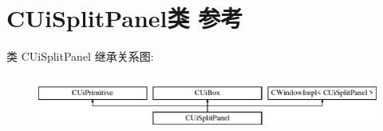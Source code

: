 \hypertarget{class_c_ui_split_panel}{}\section{C\+Ui\+Split\+Panel类 参考}
\label{class_c_ui_split_panel}
类 C\+Ui\+Split\+Panel 继承关系图\+:\begin{figure}[H]
\begin{center}
\leavevmode
\includegraphics[height=1.914530cm]{class_c_ui_split_panel}
\end{center}
\end{figure}
